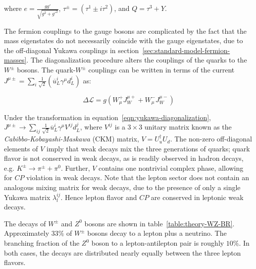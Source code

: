 where $e=\frac{gg'}{\sqrt{g^2+g'^2}}$, $\tau^{\pm}=\left(\tau^1 \pm i \tau^2\right)$, and $Q=\tau^3+Y$. 

The fermion couplings to the gauge bosons are complicated by the fact that the mass eigenstates do not necessarily coincide with the gauge eigenstates, due to the off-diagonal Yukawa couplings in section~\ref{sec:standard-model-fermion-masses}. The diagonalization procedure alters the couplings of the quarks to the $W^{\pm}$ bosons. The quark-$W^{\pm}$ couplings can be written in terms of the current $J^{\mu\pm}=\sum_{i} \frac1{\sqrt{2}}\left(\overline{u}_L^i\gamma^{\mu}d_L^i\right)$ as:

\begin{equation}
	\Delta\mathcal{L} = g (W^+_{\mu}J^{\mu+}_W + W^{-}_{\mu}J^{\mu -}_{W})
\end{equation}

Under the transformation in equation~\ref{eqn:yukawa-diagonalization}, $J^{\mu\pm}\rightarrow \sum_{ij}\frac{1}{\sqrt{2}} \overline{u}_L^i \gamma^{\mu} V^{ij} d_L^j$, where $V^{ij}$ is a $3\times 3$ unitary matrix known as the \emph{Cabibbo-Kobayashi-Maskawa} (CKM) matrix, $V = U_{u}^{\dagger} U_d$. The non-zero off-diagonal elements of $V$ imply that weak decays mix the three generations of quarks; quark flavor is not conserved in weak decays, as is readily observed in hadron decays, e.g. $K^{\pm}\rightarrow \pi^{\pm}+\pi^0$. Further, $V$ contains one nontrivial complex phase, allowing for $CP$ violation in weak decays. Note that the lepton sector does not contain an analogous mixing matrix for weak decays, due to the presence of only a single Yukawa matrix $\lambda^{ij}_l$. Hence lepton flavor and $CP$ are conserved in leptonic weak decays.

The decays of $W^{\pm}$ and $Z^0$ bosons are shown in table~\ref{table:theory-WZ-BR}. Approximately $33\%$ of $W^{\pm}$ bosons decay to a lepton plus a neutrino. The branching fraction of the $Z^0$ boson to a lepton-antilepton pair is roughly $10\%$. In both cases, the decays are distributed nearly equally between the three lepton flavors. 

